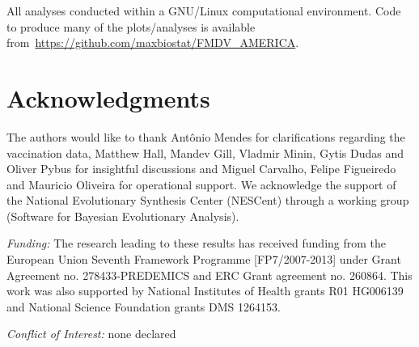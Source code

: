 \documentclass[10pt]{article}
\begin{document}
All analyses conducted within a GNU/Linux computational environment.
Code to produce many of the plots/analyses is available from~\url{https://github.com/maxbiostat/FMDV_AMERICA}.

\section*{Acknowledgments}
The authors would like to thank Ant\^onio Mendes for clarifications regarding the vaccination data, Matthew Hall, Mandev Gill, Vladmir Minin, Gytis Dudas and Oliver Pybus for insightful discussions and Miguel Carvalho, Felipe Figueiredo and Mauricio Oliveira for operational support.
We acknowledge the support of the National Evolutionary Synthesis Center (NESCent) through a working group (Software for Bayesian Evolutionary Analysis).

\emph{Funding:} The research leading to these results has received funding from the European Union Seventh Framework Programme [FP7/2007-2013] under Grant Agreement no. 278433-PREDEMICS and ERC Grant agreement no. 260864.
This work was also supported by National Institutes of Health grants R01 HG006139 and National Science Foundation grants DMS 1264153.

\emph{Conflict of Interest:} none declared
\end{document}
